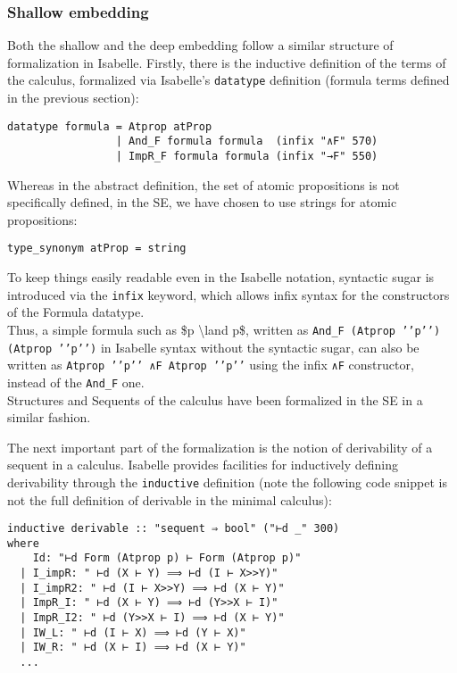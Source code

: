 \documentclass[]{article}
\begin{document}
\subsubsection{Shallow embedding}\label{shallow-embedding}

Both the shallow and the deep embedding follow a similar structure of
formalization in Isabelle. Firstly, there is the inductive definition of
the terms of the calculus, formalized via Isabelle's \texttt{datatype}
definition (formula terms defined in the previous section):

\begin{verbatim}
datatype formula = Atprop atProp
                 | And_F formula formula  (infix "∧F" 570)
                 | ImpR_F formula formula (infix "→F" 550)
\end{verbatim}

Whereas in the abstract definition, the set of atomic propositions is
not specifically defined, in the SE, we have chosen to use strings for
atomic propositions:

\begin{verbatim}
type_synonym atProp = string
\end{verbatim}

To keep things easily readable even in the Isabelle notation, syntactic
sugar is introduced via the \texttt{infix} keyword, which allows infix
syntax for the constructors of the Formula datatype.\\ Thus, a simple
formula such as \$p \textbackslash{}land p\$, written as
\texttt{And\_F (Atprop ’’p’’) (Atprop ’’p’’)} in Isabelle syntax without
the syntactic sugar, can also be written as
\texttt{Atprop ’’p’’ ∧F Atprop ’’p’’} using the infix \texttt{∧F}
constructor, instead of the \texttt{And\_F} one.\\ Structures and
Sequents of the calculus have been formalized in the SE in a similar
fashion.

The next important part of the formalization is the notion of
derivability of a sequent in a calculus. Isabelle provides facilities
for inductively defining derivability through the \texttt{inductive}
definition (note the following code snippet is not the full definition
of derivable in the minimal calculus):

\begin{verbatim}
inductive derivable :: "sequent ⇒ bool" ("⊢d _" 300)
where
    Id: "⊢d Form (Atprop p) ⊢ Form (Atprop p)"
  | I_impR: " ⊢d (X ⊢ Y) ⟹ ⊢d (I ⊢ X>>Y)"
  | I_impR2: " ⊢d (I ⊢ X>>Y) ⟹ ⊢d (X ⊢ Y)"
  | ImpR_I: " ⊢d (X ⊢ Y) ⟹ ⊢d (Y>>X ⊢ I)"
  | ImpR_I2: " ⊢d (Y>>X ⊢ I) ⟹ ⊢d (X ⊢ Y)"
  | IW_L: " ⊢d (I ⊢ X) ⟹ ⊢d (Y ⊢ X)"
  | IW_R: " ⊢d (X ⊢ I) ⟹ ⊢d (X ⊢ Y)"
  ...
\end{verbatim}
\end{document}
